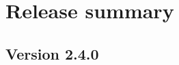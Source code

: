 \documentclass[git]{deltares_manual}
\newcommand{\fmprofversion}{2.4.0}
\begin{document}
    \chapter{Release summary}\label{ch:release-summary}


    \section{Version \fmprofversion}\label{sec:version-fmprofversion}

    \pagestyle{empty} %
    \mbox{}
    
\end{document}
